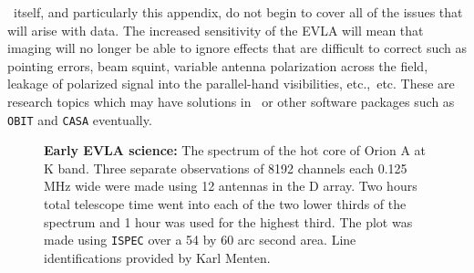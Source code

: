 \AIPS\ itself, and particularly this appendix, do not begin to cover
all of the issues that will arise with  data.  The
increased sensitivity of the EVLA will mean that imaging will no
longer be able to ignore effects that are difficult to correct such as
pointing errors, beam squint, variable antenna polarization across the
field, leakage of polarized signal into the parallel-hand
visibilities, etc.,~etc.  These are research topics which may have
solutions in \AIPS\ or other software packages such as {\tt OBIT} and
{\tt CASA} eventually.


\vfill\eject

\begin{figure}[!ht]
\centering
\caption[Orion hot core at K band]{{\bf Early EVLA science:} The
spectrum of the hot core of Orion A at K band.  Three separate
observations of 8192 channels each 0.125 MHz wide were made using 12
antennas in the D array.  Two hours total telescope time went into
each of the two lower thirds of the spectrum and 1 hour was used for
the highest third.  The plot was made using {\tt ISPEC} over a 54 by
60 arc second area.  Line identifications provided by Karl
Menten.}
\label{fig:OrionKband}
\end{figure}

